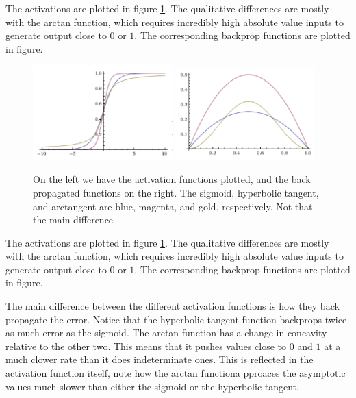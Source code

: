 \documentclass[prl,amsmath,amssymb,floatfix,superscriptaddress,notitlepage,twocolumn]{revtex4}
\begin{document}
The activations are plotted in figure \ref{AF}. The qualitative differences are mostly with the arctan function, which requires incredibly high absolute value inputs to generate output close to $0$ or $1$. The corresponding backprop functions are plotted in figure.

\begin{figure}[ht!]
\label{AF}
\centering
\includegraphics[width=0.48\textwidth]{ActivationFunctions.png}\hfill
\includegraphics[width=0.48\textwidth]{BackPropActivationFunctions.png}
\caption{On the left we have the activation functions plotted, and the back propagated functions on the right. The sigmoid, hyperbolic tangent, and arctangent are blue, magenta, and gold, respectively. Not that the main difference }
\end{figure}

The activations are plotted in figure \ref{AF}. The qualitative differences are mostly with the arctan function, which requires incredibly high absolute value inputs to generate output close to $0$ or $1$. The corresponding backprop functions are plotted in figure.

The main difference between the different activation functions is how they back propagate the error. Notice that the hyperbolic tangent function backprops twice as much error as the sigmoid. The arctan function has a change in concavity relative to the other two. This means that it pushes values close to $0$ and $1$ at a much clower rate than it does indeterminate ones. This is reflected in the activation function itself, note how the arctan functiona pproaces the asymptotic values much slower than either the sigmoid or the hyperbolic tangent. 
\end{document}
